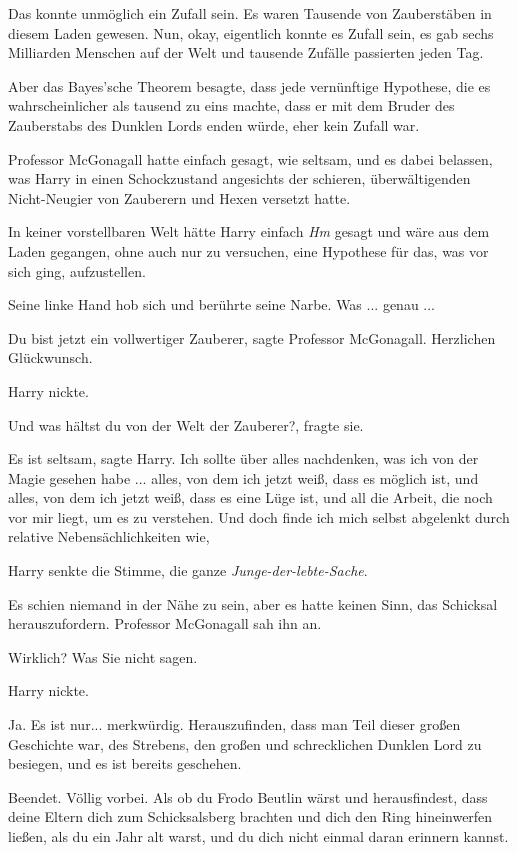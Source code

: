 Das konnte unmöglich ein Zufall sein. Es waren Tausende von Zauberstäben in
diesem Laden gewesen. Nun, okay, eigentlich konnte es Zufall sein, es gab sechs
Milliarden Menschen auf der Welt und tausende Zufälle passierten jeden Tag.

Aber das Bayes'sche Theorem besagte, dass jede vernünftige Hypothese, die es
wahrscheinlicher als tausend zu eins machte, dass er mit dem Bruder des
Zauberstabs des Dunklen Lords enden würde, eher kein Zufall war.

Professor McGonagall hatte einfach gesagt, wie seltsam, und es dabei belassen,
was Harry in einen Schockzustand angesichts der schieren, überwältigenden
Nicht-Neugier von Zauberern und Hexen versetzt hatte.

In keiner vorstellbaren Welt hätte Harry einfach \glqq{}\emph{Hm}\grqq{} gesagt
und wäre aus dem Laden gegangen, ohne auch nur zu versuchen, eine Hypothese für
das, was vor sich ging, aufzustellen.

Seine linke Hand hob sich und berührte seine Narbe. Was ... genau ...

\glqq{}Du bist jetzt ein vollwertiger Zauberer\grqq{}, sagte Professor
McGonagall. \glqq{}Herzlichen Glückwunsch.\grqq{}

Harry nickte.

\glqq{}Und was hältst du von der Welt der Zauberer?\grqq{}, fragte sie.

\glqq{}Es ist seltsam\grqq{}, sagte Harry. \glqq{}Ich sollte über alles
nachdenken, was ich von der Magie gesehen habe ... alles, von dem ich jetzt
weiß, dass es möglich ist, und alles, von dem ich jetzt weiß, dass es eine Lüge
ist, und all die Arbeit, die noch vor mir liegt, um es zu verstehen. Und doch
finde ich mich selbst abgelenkt durch relative Nebensächlichkeiten wie\grqq{},

Harry senkte die Stimme, \glqq{}die ganze \emph{Junge-der-lebte-Sache}.\grqq{}

Es schien niemand in der Nähe zu sein, aber es hatte keinen Sinn, das Schicksal
herauszufordern. Professor McGonagall sah ihn an.

\glqq{}Wirklich? Was Sie nicht sagen.\grqq{}

Harry nickte.

\glqq{}Ja. Es ist nur... merkwürdig. Herauszufinden, dass man Teil dieser großen
Geschichte war, des Strebens, den großen und schrecklichen Dunklen Lord zu
besiegen, und es ist bereits geschehen.

Beendet. Völlig vorbei. Als ob du Frodo Beutlin wärst und herausfindest, dass
deine Eltern dich zum Schicksalsberg brachten und dich den Ring hineinwerfen
ließen, als du ein Jahr alt warst, und du dich nicht einmal daran erinnern
kannst.\grqq{}

